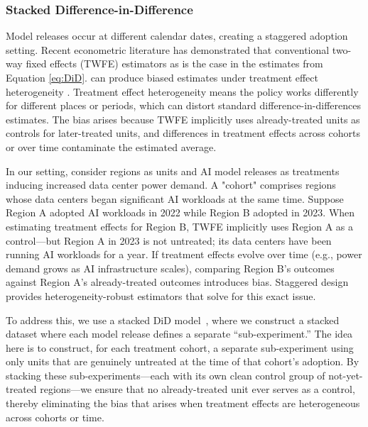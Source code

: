 \documentclass[sigconf,authordraft]{acmart}
\newcommand{\nb}[1]{\textcolor{blue}{NB[#1]}}
\begin{document}
\subsubsection{Stacked Difference-in-Difference}

Model releases occur at different calendar dates, creating a staggered adoption setting. Recent econometric literature has demonstrated that conventional two-way fixed effects (TWFE) estimators as is the case in the estimates from Equation \ref{eq:DiD}. 
can produce biased estimates under treatment effect heterogeneity 
\cite{goodman2021difference, sun2021treatment, callaway2021difference, borusyak2024revisiting}. Treatment effect heterogeneity means the policy works differently for different places or periods, which can distort standard difference-in-differences estimates. The bias arises because TWFE implicitly uses already-treated units as controls for later-treated units, and differences in treatment effects across cohorts or over time contaminate the estimated average. 

In our setting, consider regions as units and AI model releases as treatments inducing increased data center power demand. A "cohort" comprises regions whose data centers began significant AI workloads at the same time. Suppose Region A adopted AI workloads in 2022 while Region B adopted in 2023. When estimating treatment effects for Region B, TWFE implicitly uses Region A as a control—but Region A in 2023 is not untreated; its data centers have been running AI workloads for a year. If treatment effects evolve over time (e.g., power demand grows as AI infrastructure scales), comparing Region B's outcomes against Region A's already-treated outcomes introduces bias. Staggered design provides heterogeneity-robust estimators that solve for this exact issue.


To address this, we use a stacked DiD model~\cite{cengiz2019effect, deshpande2019screened}, where we construct a stacked dataset where each model release defines a separate ``sub-experiment.'' The idea here is to construct, for each treatment cohort, a separate sub-experiment using only units that are genuinely untreated at the time of that cohort's adoption. By stacking these sub-experiments—each with its own clean control group of not-yet-treated regions—we ensure that no already-treated unit ever serves as a control, thereby eliminating the bias that arises when treatment effects are heterogeneous across cohorts or time.
\end{document}
